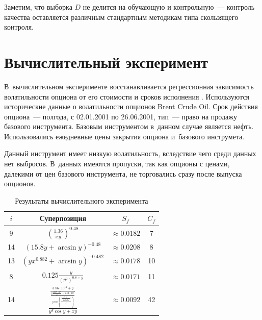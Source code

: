 \documentclass[12pt,a4paper]{article}
\begin{document}
Заметим, что выборка $D$ не делится на обучающую и контрольную~--- контроль
качества оставляется различным стандартным методикам типа скользящего контроля.


\section{Вычислительный эксперимент}

В~вычислительном эксперименте восстанавливается регрессионная зависимость
волатильности опциона от его стоимости и сроков исполнения
\cite{daglish07theory,strijov09jct}. Используются исторические данные о
волатильности опционов Brent Crude Oil. Срок действия опциона~--- полгода,
с 02.01.2001 по 26.06.2001, тип~--- право на продажу базового инструмента.
Базовым инструментом в~данном случае является нефть. Использовались
ежедневные цены закрытия опциона и~базового инструмета.

Данный инструмент имеет низкую волатильность, вследствие чего среди данных
нет выбросов. В~данных имеются пропуски, так как опционы с ценами, далекими
от цен базового инструмента, не торговались сразу после выпуска опционов.

\begin{table}[h]
  \begin{tabular}{| c | c | c | c |} \hline
	$i$ & Суперпозиция													& $S_f$				& $C_f$ \\ \hline
	9	& $\displaystyle \left(\frac{1.36}{xy}\right)^{0.48}$			& $\approx 0.0182$	& 7		\\ \hline
	14	& $\displaystyle (15.8y + \arcsin y)^{-0.48}$					& $\approx 0.0208$	& 8		\\ \hline
	13	& $\displaystyle (yx^{0.882} + \arcsin y)^{-0.482}$				& $\approx 0.0178$	& 10	\\ \hline
	8	& $\displaystyle 0.125 \frac{y}{(y^2)^{0.8+y}}$					& $\approx 0.0171$	& 11	\\ \hline
	14	& $\displaystyle \frac{\frac{3.86 \cdot 10^{11} + y}{\frac{y\frac{1.227 \cdot 10^{11}}{x^y}-2.46 \cdot 10^{8}}{y \cos \left(\frac{\frac{-5.89 \cdot 10^{-3}+y}{\frac{y - 5.47 \cdot 10^{-3}}{y \cos y}}}{y}\right)}}}{y^y \cos y + xy}$	& $\approx 0.0092$	& 42		\\ \hline
  \end{tabular}
  \caption{Результаты вычислительного эксперимента}
  \label{tabl:results}
\end{table}
\end{document}
